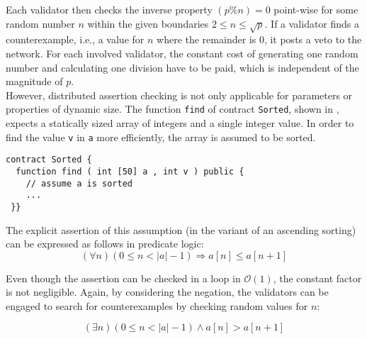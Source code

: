 Each validator then checks the inverse property $(p \% n) = 0$ point-wise for some random number $n$ within the given boundaries $2 \le n \le \sqrt{p}$. If a validator finds a counterexample, i.e., a value for $n$ where the remainder is $0$, it posts a veto to the network. For each involved validator, the constant cost of generating one random number and calculating one division have to be paid, which is independent of the magnitude of $p$. \\
However, distributed assertion checking is not only applicable for parameters or properties of dynamic size. The function \texttt{find} of contract \texttt{Sorted}, shown in , expects a statically sized array of integers and a single integer value. In order to find the value \texttt{v} in \texttt{a} more efficiently, the array is assumed to be sorted. 

\begin{lstlisting}[caption=Smart contract expecting a sorted array and an integer \cite{thiemann_2020}, numbers=none, language=Solidity, label=lst:sorted]
contract Sorted {
  function find ( int [50] a , int v ) public {
    // assume a is sorted
    ...
 }}
\end{lstlisting}

The explicit assertion of this assumption (in the variant of an ascending sorting) can be expressed as follows in predicate logic:
\begin{equation}\label{eq:sorted}
	(\forall n) (0 \leq n < |a| - 1) \Rightarrow a[n] \leq a[n+1]
\end{equation}

Even though the assertion can be checked in a loop in $\mathcal{O}(1)$, the constant factor is not negligible. Again, by considering the negation, the validators can be engaged to search for counterexamples by checking random values for $n$:
 
\begin{equation}\label{eq:sorted_neg}
	(\exists n) (0 \leq n < |a| - 1) \wedge a[n] > a[n+1]
\end{equation}

